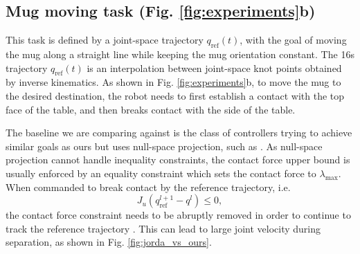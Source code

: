\vspace{-0.1cm}
\subsection{Mug moving task (Fig. \ref{fig:experiments}b) \label{sec:mug_holding_results}} 
This task is defined by a joint-space trajectory $q_{\text{ref}}(t)$, with the goal of moving the mug along a straight line while keeping the mug orientation constant. The 16s trajectory $q_{\text{ref}}(t)$ is an interpolation between joint-space knot points obtained by inverse kinematics. As shown in Fig. \ref{fig:experiments}b, to move the mug to the desired destination, the robot needs to first establish a contact with the top face of the table, and then breaks contact with the side of the table.

The baseline we are comparing against is the class of controllers trying to achieve similar goals as ours but uses null-space projection, such as \cite{jorda2019contact}. As null-space projection cannot handle inequality constraints, the contact force upper bound is usually enforced by an equality constraint which sets the contact force to $\lambda_\text{max}$. When commanded to break contact by the reference trajectory, i.e.
\begin{equation}
\label{eq:break_away}
    J_u (q_\text{ref}^{l+1} - q^l) \leq 0,
\end{equation}
the contact force constraint needs to be abruptly removed in order to continue to track the reference trajectory \cite{jorda2019contact}. This can lead to large joint velocity during separation, as shown in Fig. \ref{fig:jorda_vs_ours}.

